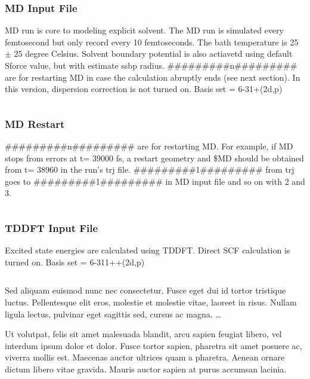 \documentclass[
journal=jpcbfk, %
manuscript=article]{achemso}
\begin{document}
		\subsubsection{MD Input File}
			 MD run is core to modeling explicit solvent. The MD run is simulated every femtosecond but only record every 10 femtoseconds. The bath temperature is 25 $\pm$ 25 degree Celsius. Solvent boundary potential is also actiavetd using default Sforce value, but with estimate ssbp radius. \#\#\#\#\#\#\#\#\#n\#\#\#\#\#\#\#\#\# are for restarting MD in case the calculation abruptly ends (see next section). In this version, dispersion correction is not turned on. Basis set = 6-31+(2d,p)
			 \inputminted[linenos, breaklines, baselinestretch=1, fontsize=\small]{Perl}{../GAMESSinpSample/MD_aniline32.inp}
			 
		\subsubsection{MD Restart}
		\#\#\#\#\#\#\#\#\#n\#\#\#\#\#\#\#\#\# are for restarting MD. For example, if MD stops from errors at t= 39000 fs, a restart geometry and \$MD should be obtained from t= 38960 in the run's trj file. \#\#\#\#\#\#\#\#\#1\#\#\#\#\#\#\#\#\# from trj goes to \#\#\#\#\#\#\#\#\#1\#\#\#\#\#\#\#\#\# in MD input file and so on with 2 and 3.
		\inputminted[linenos, breaklines, baselinestretch=1, fontsize=\small]{Perl}{../GAMESSinpSample/MD_aniline32.trj}
		
		\subsubsection{TDDFT Input File}
			Excited state energies are calculated using TDDFT. Direct SCF calculation is turned on. Basis set = 6-311++(2d,p)
			\inputminted[linenos, breaklines, baselinestretch=1, fontsize=\small]{Perl}{../GAMESSinpSample/TDDFT_aniline32_15010.inp}


\acknowledgement

Sed aliquam euismod nunc nec consectetur. Fusce eget dui id tortor tristique luctus. Pellentesque elit eros, molestie et molestie vitae, laoreet in risus. Nullam ligula lectus, pulvinar eget sagittis sed, cursus ac magna. \ldots


\suppinfo

Ut volutpat, felis sit amet malesuada blandit, arcu sapien feugiat libero, vel interdum ipsum dolor et dolor. Fusce tortor sapien, pharetra sit amet posuere ac, viverra mollis est. Maecenas auctor ultrices quam a pharetra. Aenean ornare dictum libero vitae gravida. Mauris auctor sapien at purus accumsan lacinia.


\end{document}
